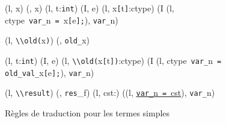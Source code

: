 \begin{figure*}[h!]
  \scriptsize{
    {
      {}
      {(l, x) \trule (\emptylist, x)}{}
    }
    {
      {(l, t:\mbox{\lstinline'int'}) \trule (I, e)}
      {(l, x\mbox{\lstinline'['}t\mbox{\lstinline']'}:ctype) \trule
        (I \concat (l, ctype~\mbox{\lstinline'var_'}n~\mbox{\lstinline'='}~x\mbox{\lstinline'['}e\mbox{\lstinline'];'}),
        \mbox{\lstinline'var_'}n)
      }{}
    }

    {
      {}
      {(l, \mbox{\lstinline'\\old('}x\mbox{\lstinline')'}) \trule
        (\emptylist, \mbox{\lstinline'old_'}x)}{}
    }

    {
      {(l, t:\mbox{\lstinline'int'}) \trule (I, e)}
      {(l, \mbox{\lstinline'\\old('}x\mbox{\lstinline'['}t\mbox{\lstinline'])'}:ctype) \trule
        (I \concat (l, ctype~\mbox{\lstinline'var_'}n~\mbox{\lstinline'= old_val_'}x\mbox{\lstinline'['}e\mbox{\lstinline'];'}),
        \mbox{\lstinline'var_'}n)
      }{}
    }

    {
      {}
      {(l, \mbox{\lstinline'\\result'}) \trule
        (\emptylist, \mbox{\lstinline'res'}_f)}{}
    }
    {
      {}
      {(l, cst:) \trule
        ((l, \underline{\Zinit\mbox{\lstinline'var_'}n~\mbox{\lstinline'='}~cst}\semicolon),
        \mbox{\lstinline'var_'}n)}{}
    }
  }
  \caption{Règles de traduction pour les termes simples}
  \label{fig:const-id}
\end{figure*}
